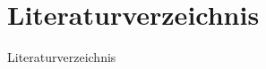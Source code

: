 \section{Literaturverzeichnis}
\begin{frame}[allowframebreaks]{Literaturverzeichnis}
    \printbibliography[heading=none]
\end{frame}
